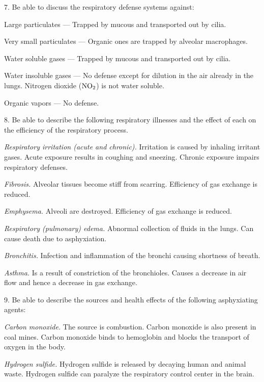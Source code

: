 \bigskip
\item{7.} Be able to discuss the respiratory defense systems against:
\item{} Large particulates --- Trapped by mucous and transported out by cilia.
\item{} Very small particulates --- Organic ones are trapped by alveolar macrophages.
\item{} Water soluble gases --- Trapped by mucous and transported out by cilia.
\item{} Water insoluble gases --- No defense except for dilution in the air already in the lungs.
Nitrogen dioxide (${\rm NO}_2$) is not water soluble.
\item{} Organic vapors --- No defense.

\vfill
\eject

\item{8.} Be able to describe the following respiratory illnesses
and the effect of each on the efficiency of the respiratory process.

{\it Respiratory irritation (acute and chronic).}
Irritation is caused by inhaling irritant gases.
Acute exposure results in coughing and sneezing.
Chronic exposure impairs respiratory defenses.

{\it Fibrosis.}
Alveolar tissues become stiff from scarring.
Efficiency of gas exchange is reduced.

{\it Emphysema.}
Alveoli are destroyed. Efficiency of gas exchange is reduced.

{\it Respiratory (pulmonary) edema.}
Abnormal collection of fluids in the lungs.
Can cause death due to asphyxiation.

{\it Bronchitis.}
Infection and inflammation of the bronchi causing
shortness of breath.

{\it Asthma.}
Is a result of constriction of the bronchioles.
Causes a decrease in air flow and hence a decrease in gas exchange.

\bigskip
\item{9.} Be able to describe the sources and health effects of the
following asphyxiating agents:

{\it Carbon monoxide.}
The source is combustion.
Carbon monoxide is also present in coal mines.
Carbon monoxide binds to hemoglobin and blocks the transport
of oxygen in the body.

{\it Hydrogen sulfide.}
Hydrogen sulfide is released by decaying human and animal waste.
Hydrogen sulfide can paralyze the respiratory control
center in the brain.

